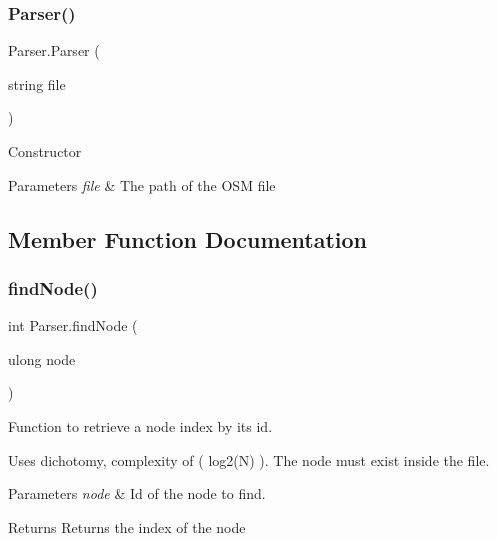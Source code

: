 \subsubsection{\texorpdfstring{Parser()}{Parser()}}
{\footnotesize\ttfamily Parser.\+Parser (\begin{DoxyParamCaption}\item[{string}]{file }\end{DoxyParamCaption})\hspace{0.3cm}{\ttfamily [inline]}}



Constructor 


\begin{DoxyParams}{Parameters}
{\em file} & The path of the O\+SM file\\
\hline
\end{DoxyParams}


\subsection{Member Function Documentation}
\mbox{\label{classParser_a11cf257955d37fc10f3a003011e426b1}} 
\subsubsection{\texorpdfstring{find\+Node()}{findNode()}\hspace{0.1cm}{\footnotesize\ttfamily [1/2]}}
{\footnotesize\ttfamily int Parser.\+find\+Node (\begin{DoxyParamCaption}\item[{ulong}]{node }\end{DoxyParamCaption})\hspace{0.3cm}{\ttfamily [inline]}}



Function to retrieve a node index by its id. 

Uses dichotomy, complexity of ( log2(\+N) ). The node must exist inside the file.


\begin{DoxyParams}{Parameters}
{\em node} & Id of the node to find.\\
\hline
\end{DoxyParams}
\begin{DoxyReturn}{Returns}
Returns the index of the node
\end{DoxyReturn}
\mbox{\label{classParser_a6c935988689e10f4d853a121f8325779}} 
